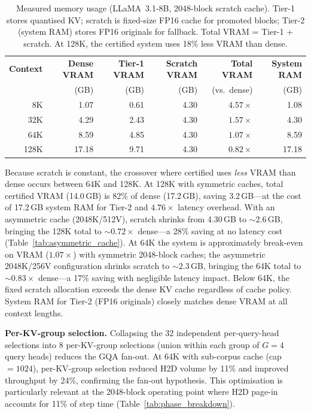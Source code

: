 \documentclass[11pt,a4paper]{article}
\theoremstyle{definition}
\theoremstyle{remark}
\begin{document}
\begin{table}[H]
\centering
\caption{Measured memory usage (LLaMA~3.1-8B, 2048-block scratch cache).  Tier-1 stores quantised KV; scratch is fixed-size FP16 cache for promoted blocks; Tier-2 (system RAM) stores FP16 originals for fallback.  Total VRAM = Tier-1 + scratch.  At 128K, the certified system uses 18\% less VRAM than dense.}
\label{tab:memory}
\small
\begin{tabular}{rrrrrr}
\toprule
\textbf{Context} & \textbf{Dense VRAM} & \textbf{Tier-1 VRAM} & \textbf{Scratch VRAM} & \textbf{Total VRAM} & \textbf{System RAM} \\
 & (GB) & (GB) & (GB) & (vs.\ dense) & (GB) \\
\midrule
8K   & 1.07 & 0.61 & 4.30 & $4.57\times$ & 1.08 \\
32K  & 4.29 & 2.43 & 4.30 & $1.57\times$ & 4.30 \\
64K  & 8.59 & 4.85 & 4.30 & $1.07\times$ & 8.59 \\
\rowcolor[gray]{0.92}
128K & 17.18 & 9.71 & 4.30 & $0.82\times$ & 17.18 \\
\bottomrule
\end{tabular}
\end{table}

Because scratch is constant, the crossover where certified uses \emph{less} VRAM than dense occurs between 64K and 128K.  At 128K with symmetric caches, total certified VRAM (14.0\,GB) is 82\% of dense (17.2\,GB), saving 3.2\,GB---at the cost of 17.2\,GB system RAM for Tier-2 and $4.76\times$ latency overhead.  With an asymmetric cache (2048K/512V), scratch shrinks from 4.30\,GB to ${\sim}2.6$\,GB, bringing the 128K total to ${\sim}0.72\times$ dense---a 28\% saving at no latency cost (Table~\ref{tab:asymmetric_cache}).  At 64K the system is approximately break-even on VRAM ($1.07\times$) with symmetric 2048-block caches; the asymmetric 2048K/256V configuration shrinks scratch to ${\sim}2.3$\,GB, bringing the 64K total to ${\sim}0.83\times$ dense---a 17\% saving with negligible latency impact.  Below 64K, the fixed scratch allocation exceeds the dense KV cache regardless of cache policy.  System RAM for Tier-2 (FP16 originals) closely matches dense VRAM at all context lengths.

\textbf{Per-KV-group selection.}  Collapsing the 32 independent per-query-head selections into 8 per-KV-group selections (union within each group of $G{=}4$ query heads) reduces the GQA fan-out.  At 64K with sub-corpus cache (cap${}=1024$), per-KV-group selection reduced H2D volume by 11\% and improved throughput by 24\%, confirming the fan-out hypothesis.  This optimisation is particularly relevant at the 2048-block operating point where H2D page-in accounts for 11\% of step time (Table~\ref{tab:phase_breakdown}).
\end{document}
